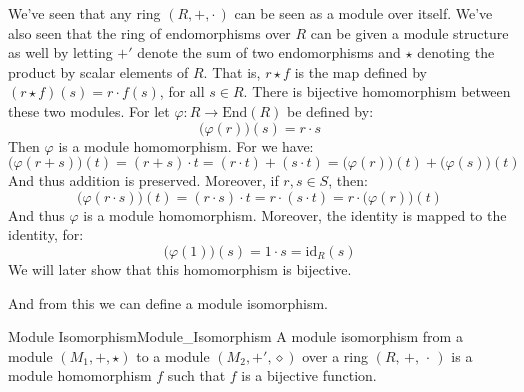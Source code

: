     \begin{example}
        We've seen that any ring $(R,+,\cdot\,)$ can be seen as a module over
        itself. We've also seen that the ring of endomorphisms over $R$ 
        can be given a module structure as well by letting $\boldsymbol{+}'$
        denote the sum of two endomorphisms and $\star$ denoting the product
        by scalar elements of $R$. That is, $r\star{f}$ is the map defined by
        $(r\star{f})(s)=r\cdot{f}(s)$, for all $s\in{R}$. There is bijective
        homomorphism between these two modules. For let
        $\varphi:R\rightarrow\textrm{End}(R)$ be defined by:
        \begin{equation}
            \big(\varphi(r)\big)(s)=r\cdot{s}
        \end{equation}
        Then $\varphi$ is a module homomorphism. For we have:
        \begin{equation}
            \big(\varphi(r+s)\big)(t)=(r+s)\cdot{t}
                =(r\cdot{t})+(s\cdot{t})
                =\big(\varphi(r)\big)(t)+\big(\varphi(s)\big)(t)
        \end{equation}
        And thus addition is preserved. Moreover, if $r,s\in{S}$, then:
        \begin{equation}
            \big(\varphi(r\cdot{s})\big)(t)
            =(r\cdot{s})\cdot{t}
            =r\cdot(s\cdot{t})
            =r\cdot\big(\varphi(r)\big)(t)
        \end{equation}
        And thus $\varphi$ is a module homomorphism. Moreover, the identity is
        mapped to the identity, for:
        \begin{equation}
            \big(\varphi(1)\big)(s)=1\cdot{s}=\textrm{id}_{R}(s)
        \end{equation}
        We will later show that this homomorphism is bijective.
    \end{example}
    And from this we can define a module isomorphism.
    \begin{fdefinition}{Module Isomorphism}{Module_Isomorphism}
        A \gls{module isomorphism} from a \gls{module}
        $(M_{1},\boldsymbol{+},\star)$ to a module
        $(M_{2},\boldsymbol{+}',\diamond)$ over a \gls{ring}
        $(R,\,+,\,\cdot\,)$ is a \gls{module homomorphism} $f$ such that $f$ is
        a \gls{bijective function}.
    \end{fdefinition}
